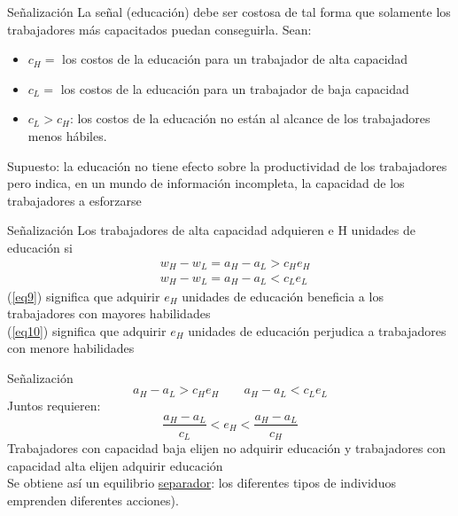 \begin{frame}{Señalización}
	La señal (educación) debe ser costosa de tal forma que solamente los trabajadores más capacitados puedan conseguirla. Sean:
		\begin{itemize}
			\item $c_H =$ los costos de la educación para un trabajador de alta capacidad
			\item $c_L=$ los costos de la educación para un trabajador de baja capacidad
			\item $c_L > c_H$: los costos de la educación no están al alcance de los trabajadores menos hábiles.
		\end{itemize}
	Supuesto: la educación no tiene efecto sobre la productividad de los trabajadores pero indica, en un mundo de información incompleta, la capacidad de los trabajadores a esforzarse
\end{frame}
\begin{frame}{Señalización}
	Los trabajadores de alta capacidad adquieren e H unidades de educación si 
		\begin{align}
			&w_H - w_L = a_H - a_L > c_He_H \label{eq9}\\
			&w_H - w_L = a_H - a_L < c_Le_L \label{eq10}
		\end{align}
	(\ref{eq9}) significa que adquirir $e_H$ unidades de educación beneficia a los trabajadores con mayores habilidades\\
	(\ref{eq10}) significa que adquirir $e_H$ unidades de educación perjudica a trabajadores con menore habilidades
\end{frame}
\begin{frame}{Señalización}
		$$a_H - a_L > c_He_H \qquad a_H - a_L < c_Le_L$$
	Juntos requieren:
		$$\frac{a_H-a_L}{c_L} < e_H < \frac{a_H-a_L}{c_H}$$
	Trabajadores con capacidad baja elijen no adquirir educación y trabajadores con capacidad alta elijen adquirir educación\\[0.3cm]
	
	Se obtiene así un equilibrio \underline{separador}: los diferentes tipos de individuos emprenden diferentes acciones).
\end{frame}